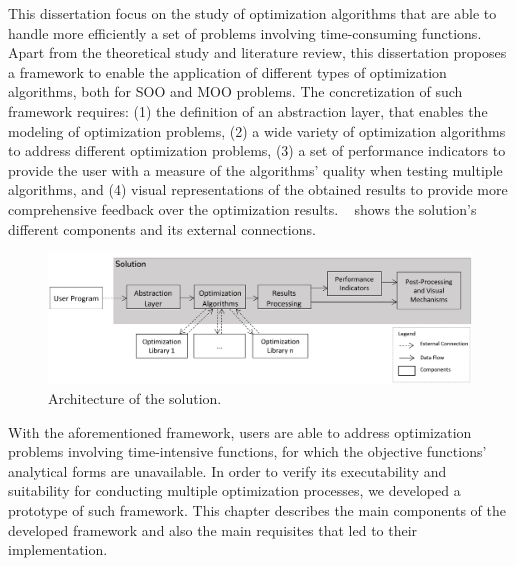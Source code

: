 \label{chap:architecture}

This dissertation focus on the study of optimization algorithms that are able to handle more efficiently a set of problems involving time-consuming functions. Apart from the theoretical study and literature review, this dissertation proposes a framework to enable the application of different types of optimization algorithms, both for \ac{SOO} and \ac{MOO} problems. The concretization of such framework requires: (1) the definition of an abstraction layer, that enables the modeling of optimization problems, (2) a wide variety of optimization algorithms to address different optimization problems, (3) a set of performance indicators to provide the user with a measure of the algorithms' quality when testing multiple algorithms, and (4) visual representations of the obtained results to provide more comprehensive feedback over the optimization results. ~ shows the  solution's different components and its external connections.


\begin{figure}[htbp]
	\centering
	\includegraphics[width=\textwidth]{./Images/Solution/solution_architecture_2.PNG}
	\caption{Architecture of the solution.}
	\label{fig:solution}
\end{figure}

With the aforementioned framework, users are able to address optimization problems involving time-intensive functions, for which the objective functions' analytical forms are unavailable. In order to verify its executability and suitability for conducting multiple optimization processes, we developed a prototype of such framework. This chapter describes the main components of the developed framework and also the main requisites that led to their implementation. 


